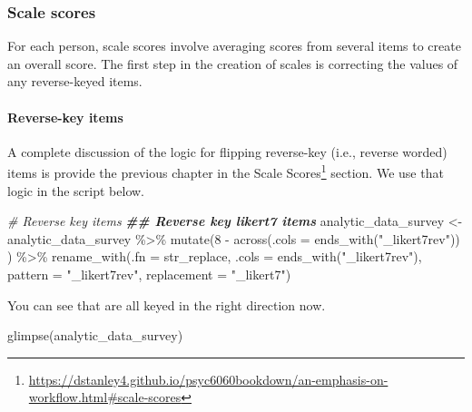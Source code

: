 \documentclass[
]{krantz}
\makeatletter
\newenvironment{Shaded}{\begin{snugshade}}{\end{snugshade}}
\newcommand{\AttributeTok}[1]{\textcolor[rgb]{0.61,0.61,0.61}{#1}}
\newcommand{\CommentTok}[1]{\textcolor[rgb]{0.37,0.37,0.37}{\textit{#1}}}
\newcommand{\DecValTok}[1]{\textcolor[rgb]{0.06,0.06,0.06}{#1}}
\newcommand{\DocumentationTok}[1]{\textcolor[rgb]{0.37,0.37,0.37}{\textbf{\textit{#1}}}}
\newcommand{\FunctionTok}[1]{\textcolor[rgb]{0,0,0}{#1}}
\newcommand{\NormalTok}[1]{#1}
\newcommand{\OtherTok}[1]{\textcolor[rgb]{0.37,0.37,0.37}{#1}}
\newcommand{\SpecialCharTok}[1]{\textcolor[rgb]{0,0,0}{#1}}
\newcommand{\StringTok}[1]{\textcolor[rgb]{0.5,0.5,0.5}{#1}}
\renewcommand{\href}[2]{#2\footnote{\url{#1}}}
\newenvironment{kframe}{%
\medskip{}
\setlength{\fboxsep}{.8em}
 \def\at@end@of@kframe{}%
 \ifinner\ifhmode%
  \def\at@end@of@kframe{\end{minipage}}%
  \begin{minipage}{\columnwidth}%
 \fi\fi%
 \def\FrameCommand##1{\hskip\@totalleftmargin \hskip-\fboxsep
 \colorbox{shadecolor}{##1}\hskip-\fboxsep
     \hskip-\linewidth \hskip-\@totalleftmargin \hskip\columnwidth}%
 \MakeFramed {\advance\hsize-\width
   \@totalleftmargin\z@ \linewidth\hsize
   \@setminipage}}%
 {\par\unskip\endMakeFramed%
 \at@end@of@kframe}
\renewenvironment{Shaded}{\begin{kframe}}{\end{kframe}}
\makeatother
\begin{document}
\hypertarget{scale-scores-1}{%
\subsubsection{Scale scores}\label{scale-scores-1}}

For each person, scale scores involve averaging scores from several items to create an overall score. The first step in the creation of scales is correcting the values of any reverse-keyed items.

\hypertarget{reverse-key-items-1}{%
\paragraph{Reverse-key items}\label{reverse-key-items-1}}

A complete discussion of the logic for flipping reverse-key (i.e., reverse worded) items is provide the previous chapter in the \href{https://dstanley4.github.io/psyc6060bookdown/an-emphasis-on-workflow.html\#scale-scores}{Scale Scores} section. We use that logic in the script below.

\begin{Shaded}
\begin{Highlighting}[]
\CommentTok{\# Reverse key items}
\DocumentationTok{\#\# Reverse key likert7 items}
\NormalTok{analytic\_data\_survey }\OtherTok{\textless{}{-}}\NormalTok{ analytic\_data\_survey }\SpecialCharTok{\%\textgreater{}\%} 
  \FunctionTok{mutate}\NormalTok{(}\DecValTok{8} \SpecialCharTok{{-}} \FunctionTok{across}\NormalTok{(}\AttributeTok{.cols =} \FunctionTok{ends\_with}\NormalTok{(}\StringTok{"\_likert7rev"}\NormalTok{)) ) }\SpecialCharTok{\%\textgreater{}\%} 
  \FunctionTok{rename\_with}\NormalTok{(}\AttributeTok{.fn =}\NormalTok{ str\_replace,}
              \AttributeTok{.cols =} \FunctionTok{ends\_with}\NormalTok{(}\StringTok{"\_likert7rev"}\NormalTok{),}
              \AttributeTok{pattern =} \StringTok{"\_likert7rev"}\NormalTok{,}
              \AttributeTok{replacement =} \StringTok{"\_likert7"}\NormalTok{)}
\end{Highlighting}
\end{Shaded}

You can see that are all keyed in the right direction now.

\begin{Shaded}
\begin{Highlighting}[]
\FunctionTok{glimpse}\NormalTok{(analytic\_data\_survey)}
\end{Highlighting}
\end{Shaded}
\end{document}
